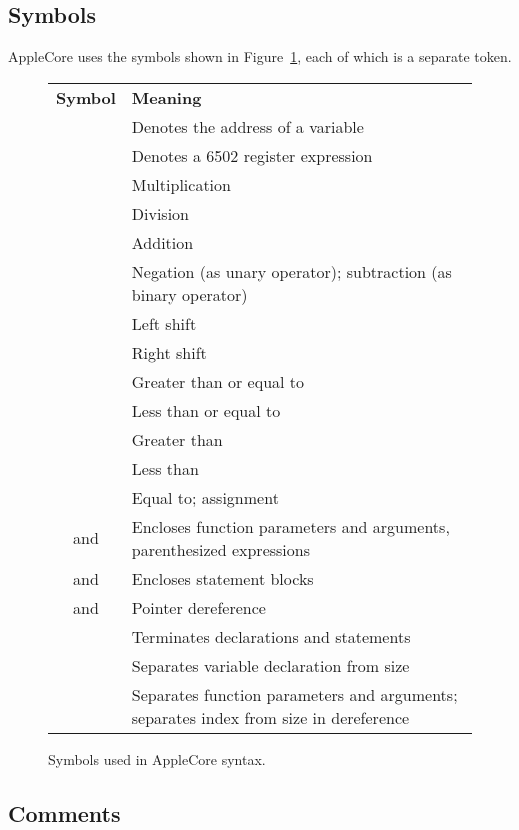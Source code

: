 \documentclass[10pt]{article}
\begin{document}
\subsection{Symbols}

AppleCore uses the symbols shown in Figure~\ref{fig:symbols}, each of
which is a separate token.

\begin{figure}[th]
\begin{center}
\begin{tabular}{c l}
\textbf{Symbol} & \textbf{Meaning} \\
%
\kwd{@} & Denotes the address of a variable \\
%
\kwd{\^} & Denotes a 6502 register expression \\
\kwd{*}  & Multiplication \\
\kwd{/}  & Division \\
\kwd{+}  & Addition \\
\kwd{-}  & Negation (as unary operator); subtraction (as binary
operator) \\
\kwd{<<} & Left shift \\
\kwd{>>} & Right shift \\
\kwd{>=} & Greater than or equal to \\
\kwd{<=} & Less than or equal to \\
\kwd{>}  & Greater than \\
\kwd{<}  & Less than \\
\kwd{=}  & Equal to; assignment \\
\kwd{(} and \kwd{)} & Encloses function parameters and arguments, parenthesized expressions
\\
\kwd{\{} and \kwd{\}} & Encloses statement blocks \\
\kwd{[} and \kwd{]} & Pointer dereference \\
\kwd{;} & Terminates declarations and statements \\
\kwd{:} & Separates variable declaration from size \\
\kwd{,} & Separates function parameters and arguments; separates index from size in dereference \\
\end{tabular}
\end{center}
\caption{Symbols used in AppleCore syntax.}
\label{fig:symbols}
\end{figure}

\subsection{Comments}
\label{sec:lexical:comments}
\end{document}
